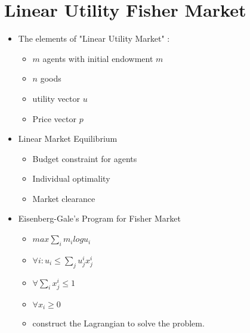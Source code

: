 \documentclass{article}
\begin{document}
\section{Linear Utility Fisher Market}
\begin{itemize}
  \item The elements of "Linear Utility Market" :
  \begin{itemize}
    \item $m$ agents with initial endowment $m$
    \item $n$ goods
    \item utility vector $u$
    \item Price vector $p$
  \end{itemize}

  \item Linear Market Equilibrium
  \begin{itemize}
    \item Budget constraint for agents
    \item Individual optimality
    \item Market clearance
  \end{itemize}

  \item Eisenberg-Gale’s Program for Fisher Market
  \begin{itemize}
    \item $max \sum_i m_ilogu_i$
    \item $ \forall i:u_i \leq \sum_j u_j^ix_j^i$
    \item $ \forall \sum_i x_j^i \leq 1$
    \item $ \forall x_i \geq 0$
    \item construct the Lagrangian to solve the problem.
  \end{itemize}

\end{itemize}
\end{document}
